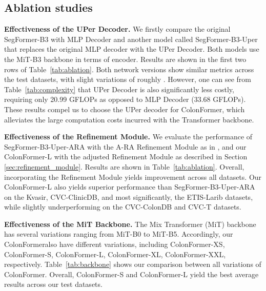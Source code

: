 \documentclass{article}
\newcommand{\ModelName}{ColonFormer}
\begin{document}
{\subsection{Ablation studies}
\label{sec:ablation_studies}
\textbf{Effectiveness of the UPer Decoder.} We firstly compare the original SegFormer-B3 \cite{segformer} with MLP Decoder and another model called SegFormer-B3-Uper that replaces the original MLP decoder with the UPer Decoder. Both models use the MiT-B3 backbone in terms of encoder. 
Results are shown in the first two rows of Table~\ref{tab:ablation}. Both network versions show similar metrics across the test datasets, with slight variations of roughly . However, one can see from Table~\ref{tab:complexity} that UPer Decoder is also significantly less costly, requiring only 20.99 GFLOPs as opposed to MLP Decoder (33.68 GFLOPs). These results compel us to choose the UPer decoder for \ModelName, which alleviates the large computation costs incurred with the Transformer backbone.


\textbf{Effectiveness of the Refinement Module.} We evaluate the performance of SegFormer-B3-Uper-ARA with the {{A-RA}} Refinement Module as in \cite{caranet}, and our \ModelName-L with the adjusted Refinement Module as described in Section \ref{sec:refinement_module}. Results are shown in Table~\ref{tab:ablation}. Overall, incorporating the Refinement Module yields improvement across all datasets. Our \ModelName-L also yields superior performance than SegFormer-B3-Uper-ARA on the Kvasir, CVC-ClinicDB, and most significantly, the ETIS-Larib datasets, while slightly underperforming on the CVC-ColonDB and CVC-T datasets.

\textbf{Effectiveness of the MiT Backbone.} The Mix Transformer (MiT) \cite{segformer} backbone has several variations ranging from MiT-B0 to MiT-B5. Accordingly, our \ModelName also have different variations, including \ModelName-XS, \ModelName-S, \ModelName-L, \ModelName-XL, \ModelName-XXL, respectively. Table~\ref{tab:backbone} shows our comparison between all variations of \ModelName. Overall, \ModelName-S and \ModelName-L yield the best average results across our test datasets.







}
\end{document}

